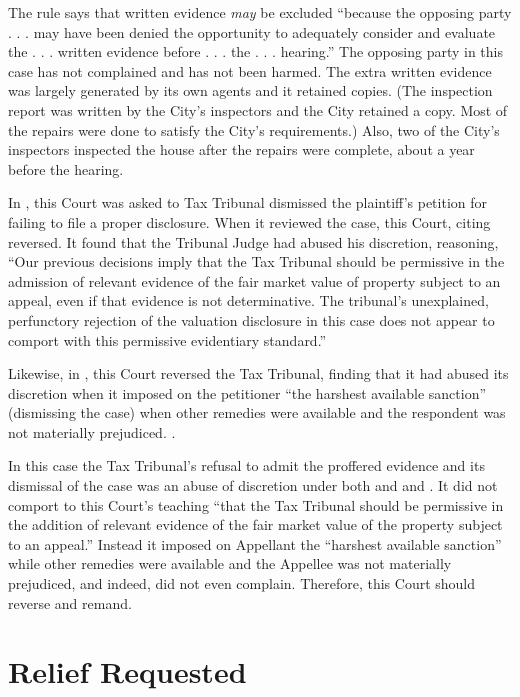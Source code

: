 \documentclass[12pt,\documentclassflag]{michiganCourtOfAppealsBrief}
\begin{document}
{The rule says that written evidence \emph{may} be excluded ``because the opposing party . . . may have been denied the opportunity to adequately consider and evaluate the . . . written evidence before . . . the . . .  hearing.'' The opposing party in this case has not complained and has not been harmed. The extra written evidence was largely generated by its own agents and it retained copies. (The inspection report was written by the City's inspectors and the City retained a copy. Most of the repairs were done to satisfy the City's requirements.) Also, two of the City's inspectors inspected the house after the repairs were complete, about a year before the hearing.


In \cite[s]{Professional Plaza}, this Court was asked to  Tax Tribunal dismissed the plaintiff's petition for failing to file a proper disclosure. When it reviewed the case, this Court, citing  reversed. It found that the Tribunal Judge had abused his discretion, reasoning, ``Our previous decisions imply that the Tax Tribunal should be permissive in the admission of relevant evidence of the fair market value of property subject to an appeal, even if that evidence is not determinative. The tribunal's unexplained, perfunctory rejection of the valuation disclosure in this case does not appear to comport with this permissive evidentiary standard.'' 

Likewise, in \cite{Stevens}, this Court reversed the Tax Tribunal, finding that it had abused its discretion when it imposed on the petitioner ``the harshest available sanction'' (dismissing the case) when other remedies were available and the respondent was not materially prejudiced. .

In this case the Tax Tribunal's refusal to admit the proffered evidence and its dismissal of the case was an abuse of discretion under both \cite[s] {Professional Plaza} and and \cite[s]{Stevens}. It did not comport to this Court's teaching ``that the Tax Tribunal should be permissive in the addition of relevant evidence of the fair market value of the property subject to an appeal.'' Instead it imposed on Appellant the ``harshest available sanction'' while other remedies were available and the Appellee was not materially prejudiced, and indeed, did not even complain. Therefore, this Court should reverse and remand. 

\section{Relief Requested}

}
\end{document}
